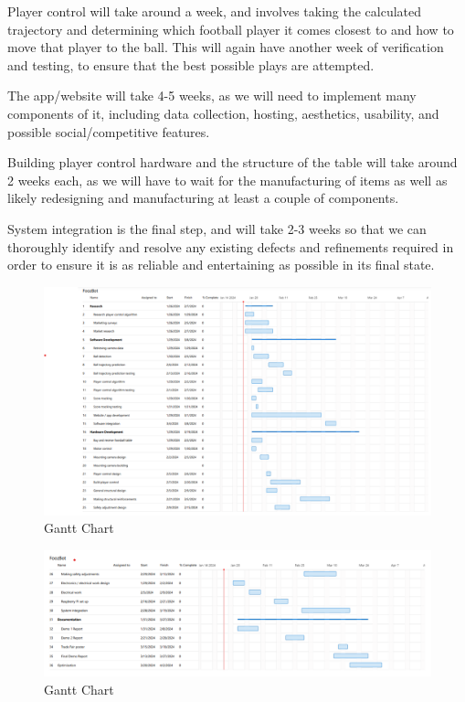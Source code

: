 \documentclass{article}
\begin{document}
Player control will take around a week, and involves taking the calculated trajectory and determining which football player it comes closest to and how to move that player to the ball. This will again have another week of verification and testing, to ensure that the best possible plays are attempted.

The app/website will take 4-5 weeks, as we will need to implement many components of it, including data collection, hosting, aesthetics, usability, and possible social/competitive features.

Building player control hardware and the structure of the table will take around 2 weeks each, as we will have to wait for the manufacturing of items as well as likely redesigning and manufacturing at least a couple of components.

System integration is the final step, and will take 2-3 weeks so that we can thoroughly identify and resolve any existing defects and refinements required in order to ensure it is as reliable and entertaining as possible in its final state.
\begin{figure}[!b]
    \centering
    \includegraphics[width=17cm]{figs/project timeline 1.png}
    \caption{Gantt Chart}
    \label{fig:6}
\end{figure}
\begin{figure}[!b]
    \centering
    \includegraphics[width=17cm]{figs/project timeline 2.png}
    \caption{Gantt Chart}
    \label{fig:7}
\end{figure}
\end{document}
